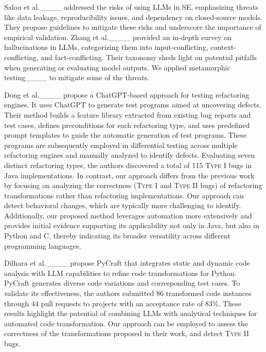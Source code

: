 Salou et al.____ addressed the risks of using LLMs in SE, emphasizing threats like data leakage, reproducibility issues, and dependency on closed-source models. They propose guidelines to mitigate these risks and underscore the importance of empirical validation. 
Zhang et al.____ provided an in-depth survey on hallucinations in LLMs, categorizing them into input-conflicting, context-conflicting, and fact-conflicting. Their taxonomy sheds light on potential pitfalls when generating or evaluating model outputs. 
We applied metamorphic testing____ to mitigate some of the threats.

Dong et al.____ propose a ChatGPT-based approach for testing refactoring engines. It uses ChatGPT to generate test programs aimed at uncovering defects. Their method builds a feature library extracted from existing bug reports and test cases, defines preconditions for each refactoring type, and uses predefined prompt templates to guide the automatic generation of test programs. These programs are subsequently employed in differential testing across multiple refactoring engines and manually analyzed to identify defects. Evaluating seven distinct refactoring types, the authors discovered a total of 115 \textsc{Type I} bugs in Java implementations.
In contrast, our approach differs from the previous work by focusing on analyzing the correctness (\textsc{Type I} and \textsc{Type II} bugs) of refactoring transformations rather than refactoring implementations. Our approach can detect behavioral changes, which are typically more challenging to identify. Additionally, our proposed method leverages automation more extensively and provides initial evidence supporting its applicability not only in Java, but also in Python and C, thereby indicating its broader versatility across different programming languages.

Dilhara et al.____ propose PyCraft that integrates static and dynamic code analysis with LLM capabilities to refine code transformations for Python. PyCraft generates diverse code variations and corresponding test cases. To validate its effectiveness, the authors submitted 86 transformed code instances through 44 pull requests to projects with an acceptance rate of 83\%. These results highlight the potential of combining LLMs with analytical techniques for automated code transformation. 
Our approach can be employed to assess the correctness of the transformations proposed in their work, and detect \textsc{Type II} bugs.

